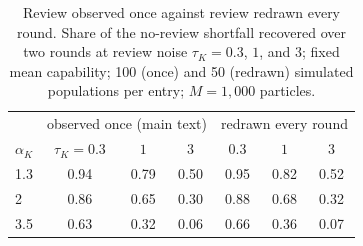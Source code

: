 \begin{table}[t]
\centering
\small
\caption{Review observed once against review redrawn every round. Share of the no-review shortfall recovered over two rounds at review noise $\tau_K = 0.3$, $1$, and $3$; fixed mean capability; 100 (once) and 50 (redrawn) simulated populations per entry; $M = 1{,}000$ particles.}
\label{tab:sens-fresh}
\begin{tabular}{@{}lcccccc@{}}
\toprule
& \multicolumn{3}{c}{observed once (main text)} & \multicolumn{3}{c}{redrawn every round} \\
$\alpha_K$ & $\tau_K = 0.3$ & $1$ & $3$ & $0.3$ & $1$ & $3$ \\
\midrule
1.3 & 0.94 & 0.79 & 0.50 & 0.95 & 0.82 & 0.52 \\
2 & 0.86 & 0.65 & 0.30 & 0.88 & 0.68 & 0.32 \\
3.5 & 0.63 & 0.32 & 0.06 & 0.66 & 0.36 & 0.07 \\
\bottomrule
\end{tabular}
\end{table}
